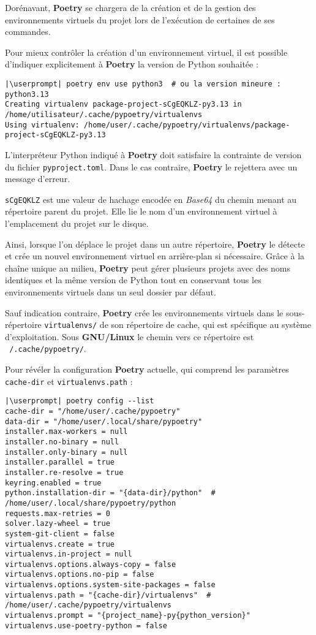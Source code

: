 Dorénavant, \textbf{Poetry} se chargera de la création et de la gestion des environnements virtuels du projet lors de l'exécution de certaines de ses commandes.

Pour mieux contrôler la création d'un environnement virtuel, il est possible d'indiquer explicitement à \textbf{Poetry} la version de Python souhaitée :
\begin{lstlisting}[style=bash]
|\userprompt| poetry env use python3  # ou la version mineure : python3.13
Creating virtualenv package-project-sCgEQKLZ-py3.13 in /home/utilisateur/.cache/pypoetry/virtualenvs
Using virtualenv: /home/user/.cache/pypoetry/virtualenvs/package-project-sCgEQKLZ-py3.13
\end{lstlisting}

L'interpréteur Python indiqué à \textbf{Poetry} doit satisfaire la contrainte de version du fichier \texttt{pyproject.toml}. Dans le cas contraire, \textbf{Poetry} le rejettera avec un message d'erreur.

\texttt{sCgEQKLZ} est une valeur de hachage encodée en \textit{Base64} du chemin menant au répertoire parent du projet. Elle lie le nom d'un environnement virtuel à l'emplacement du projet sur le disque.

Ainsi, lorsque l'on déplace le projet dans un autre répertoire, \textbf{Poetry} le détecte et crée un nouvel environnement virtuel en arrière-plan si nécessaire. Grâce à la chaîne unique au milieu, \textbf{Poetry} peut gérer plusieurs projets avec des noms identiques et la même version de Python tout en conservant tous les environnements virtuels dans un seul dossier par défaut.

Sauf indication contraire, \textbf{Poetry} crée les environnements virtuels dans le sous-répertoire \texttt{virtualenvs/} de son répertoire de cache, qui est spécifique au système d'exploitation. Sous \textbf{GNU/Linux} le chemin vers ce répertoire est \texttt{~/.cache/pypoetry/}.

Pour révéler la configuration \textbf{Poetry} actuelle, qui comprend les paramètres \texttt{cache-dir} et \texttt{virtualenvs.path} :
\begin{lstlisting}[style=bash]
|\userprompt| poetry config --list
cache-dir = "/home/user/.cache/pypoetry"
data-dir = "/home/user/.local/share/pypoetry"
installer.max-workers = null
installer.no-binary = null
installer.only-binary = null
installer.parallel = true
installer.re-resolve = true
keyring.enabled = true
python.installation-dir = "{data-dir}/python"  # /home/user/.local/share/pypoetry/python
requests.max-retries = 0
solver.lazy-wheel = true
system-git-client = false
virtualenvs.create = true
virtualenvs.in-project = null
virtualenvs.options.always-copy = false
virtualenvs.options.no-pip = false
virtualenvs.options.system-site-packages = false
virtualenvs.path = "{cache-dir}/virtualenvs"  # /home/user/.cache/pypoetry/virtualenvs
virtualenvs.prompt = "{project_name}-py{python_version}"
virtualenvs.use-poetry-python = false
\end{lstlisting}

